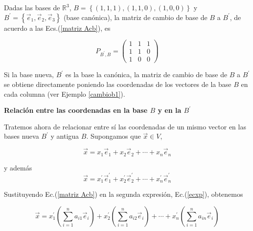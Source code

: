 \bigskip


\begin{example}
\label{cambiob1}
Dadas las bases de  $\mathbb{R}^{3}$, $B =\left\{(1,1,1), (1,1,0),(1,0,0)\right\}$ y $B^{\prime}= \left\{\vec{e}_1,\vec{e}_2, \vec{e}_3\right\}$  (base canónica), la matriz de cambio de base de $B$ a $B^{\prime}$,  de acuerdo a las Ecs.(\ref{matriz Acb}), es



$$P_{B ^{\prime},B}=\left(\begin{array}{ccc} 1 & 1 &  1 \\ 1 & 1 & 0
\\ 1 & 0 & 0
\end{array}
 \right)$$
\end{example}

\begin{remark}
\label{cambiobasecan}
Si la base nueva, $B^{\prime}$ es la base la canónica, la matriz de cambio de base de $B$ a $B^{\prime}$ se obtiene directamente  poniendo las coordenadas de los vectores de la base $B$ en cada columna  (ver Ejemplo \ref{cambiob1}).
\end{remark}




\textbf{Relación entre las coordenadas en la base $B$ y en la $B^{\prime}$}
\label{RELCOORD}

\bigskip

\noindent 
Tratemos ahora de relacionar entre sí las coordenadas de un mismo vector en las bases nueva $B ^{\prime}$  y antigua $B$. Supongamos que $\vec{x}\in V$,


    
\begin{equation}
\label{ecx}
\vec{x}= x_1\vec{e}_1+x_2\vec{e}_2+\cdots +x_n\vec{e}_n 
\end{equation}

\noindent 
y además
\begin{equation}
\label{ecxp}
\vec{x}= x^{\prime}_1\vec{e}^{\prime}_1+x^{\prime}_2\vec{e}^{\prime}_2+\cdots +x^{\prime}_n\vec{e}^{\prime}_n 
\end{equation}

\bigskip

\noindent 
Sustituyendo Ec.(\ref{matriz Acb}) en la segunda expresión, Ec.(\ref{ecxp}), obtenemos

\bigskip

$$\vec{x}= x_1^{\prime} ( \sum^{n}_{i=1}  a_{i1} \vec{e}_i)+x_2^{\prime}( \sum^{n}_{i=1}  a_{i2} \vec{e}_i)+\cdots +x_n^{\prime}( \sum^{n}_{i=1}  a_{in} \vec{e}_i)$$

